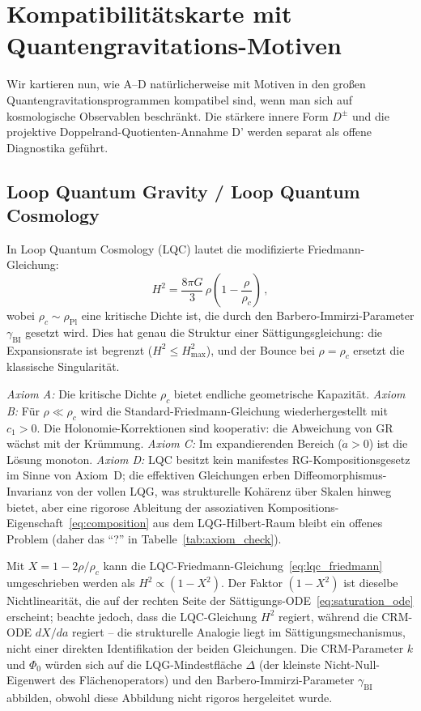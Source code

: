 \documentclass[aps,prd,twocolumn,superscriptaddress,nofootinbib]{revtex4-2}
\begin{document}
\section{Kompatibilitätskarte mit Quantengravitations-Motiven}
\label{sec:qg}

Wir kartieren nun, wie A--D natürlicherweise mit Motiven in den großen Quantengravitationsprogrammen kompatibel sind, wenn man sich auf kosmologische Observablen beschränkt. Die stärkere innere Form $D^\pm$ und die projektive Doppelrand-Quotienten-Annahme D' werden separat als offene Diagnostika geführt.

\subsection{Loop Quantum Gravity / Loop Quantum Cosmology}

In Loop Quantum Cosmology (LQC) \cite{Ashtekar2006,Bojowald2008} lautet die modifizierte Friedmann-Gleichung:
\begin{equation}
H^2 = \frac{8\pi G}{3}\,\rho\!\left(1 - \frac{\rho}{\rho_c}\right)\,,
\label{eq:lqc_friedmann}
\end{equation}
wobei $\rho_c \sim \rho_{\mathrm{Pl}}$ eine kritische Dichte ist, die durch den Barbero-Immirzi-Parameter $\gamma_{\mathrm{BI}}$ gesetzt wird. Dies hat genau die Struktur einer Sättigungsgleichung: die Expansionsrate ist begrenzt ($H^2 \leq H_{\max}^2$), und der Bounce bei $\rho = \rho_c$ ersetzt die klassische Singularität.

\textit{Axiom A:} Die kritische Dichte $\rho_c$ bietet endliche geometrische Kapazität. \textit{Axiom B:} Für $\rho \ll \rho_c$ wird die Standard-Friedmann-Gleichung wiederhergestellt mit $c_1 > 0$. Die Holonomie-Korrektionen sind kooperativ: die Abweichung von GR wächst mit der Krümmung. \textit{Axiom C:} Im expandierenden Bereich ($\dot{a} > 0$) ist die Lösung monoton. \textit{Axiom D:} LQC besitzt kein manifestes RG-Kompositionsgesetz im Sinne von Axiom~D; die effektiven Gleichungen erben Diffeomorphismus-Invarianz von der vollen LQG, was strukturelle Kohärenz über Skalen hinweg bietet, aber eine rigorose Ableitung der assoziativen Kompositions-Eigenschaft~\eqref{eq:composition} aus dem LQG-Hilbert-Raum bleibt ein offenes Problem (daher das ``?'' in Tabelle~\ref{tab:axiom_check}).

Mit $X = 1 - 2\rho/\rho_c$ kann die LQC-Friedmann-Gleichung~\eqref{eq:lqc_friedmann} umgeschrieben werden als $H^2 \propto (1 - X^2)$. Der Faktor $(1-X^2)$ ist dieselbe Nichtlinearität, die auf der rechten Seite der Sättigungs-ODE~\eqref{eq:saturation_ode} erscheint; beachte jedoch, dass die LQC-Gleichung $H^2$ regiert, während die CRM-ODE $dX/da$ regiert -- die strukturelle Analogie liegt im Sättigungsmechanismus, nicht einer direkten Identifikation der beiden Gleichungen. Die CRM-Parameter $k$ und $\Phi_0$ würden sich auf die LQG-Mindestfläche $\Delta$ (der kleinste Nicht-Null-Eigenwert des Flächenoperators) und den Barbero-Immirzi-Parameter $\gamma_{\mathrm{BI}}$ abbilden, obwohl diese Abbildung nicht rigoros hergeleitet wurde.
\end{document}
